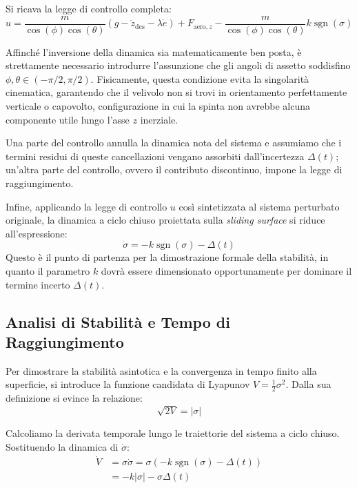 Si ricava la legge di controllo completa:
\begin{equation}
    u = \frac{m}{\cos(\phi)\cos(\theta)} \left( g - \ddot{z}_{\mathrm{des}} - \lambda \dot{e} \right) + F_{\mathrm{aero},z} - \frac{m}{\cos(\phi)\cos(\theta)} k \operatorname{sgn}(\sigma)
\end{equation}

Affinché l'inversione della dinamica sia matematicamente ben posta, è strettamente necessario introdurre l'assunzione che gli angoli di assetto soddisfino $\phi, \theta \in (-\pi/2, \pi/2)$. Fisicamente, questa condizione evita la singolarità cinematica, garantendo che il velivolo non si trovi in orientamento perfettamente verticale o capovolto, configurazione in cui la spinta non avrebbe alcuna componente utile lungo l'asse $z$ inerziale.

Una parte del controllo annulla la dinamica nota del sistema e assumiamo che i termini residui di queste cancellazioni vengano assorbiti dall'incertezza $\Delta(t)$; un'altra parte del controllo, 
ovvero il contributo discontinuo, impone la legge di raggiungimento.

Infine, applicando la legge di controllo $u$ così sintetizzata al sistema perturbato originale, la dinamica a ciclo chiuso proiettata sulla \textit{sliding surface} si riduce all'espressione:
\begin{equation}
    \dot{\sigma} = -k \operatorname{sgn}(\sigma) - \Delta(t)
\end{equation}
Questo è il punto di partenza per la dimostrazione formale della stabilità, in quanto il parametro $k$ dovrà essere dimensionato opportunamente per dominare il termine incerto $\Delta(t)$.


\subsection{Analisi di Stabilità e Tempo di Raggiungimento}
Per dimostrare la stabilità asintotica e la convergenza in tempo finito alla superficie, si introduce la funzione candidata di Lyapunov $V = \frac{1}{2}\sigma^2$. Dalla sua definizione si evince la relazione:
\begin{equation}
    \sqrt{2V} = |\sigma|
\end{equation}

Calcoliamo la derivata temporale lungo le traiettorie del sistema a ciclo chiuso. Sostituendo la dinamica di $\dot{\sigma}$:
\begin{align}
    \dot{V} &= \sigma \dot{\sigma} = \sigma \left( -k \operatorname{sgn}(\sigma) - \Delta(t) \right) \nonumber \\
            &= -k|\sigma| - \sigma \Delta(t)
\end{align}

